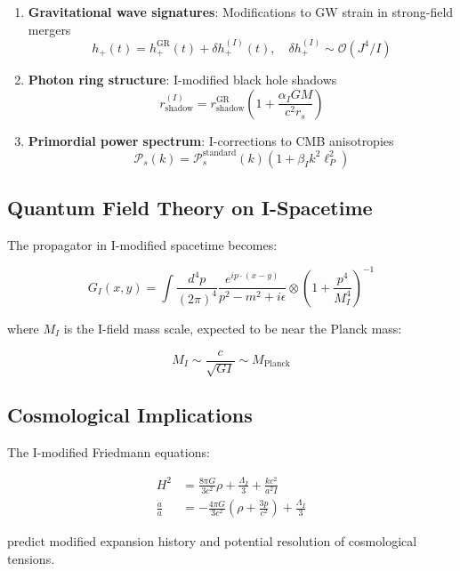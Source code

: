 \begin{enumerate}
    \item \textbf{Gravitational wave signatures}: Modifications to GW strain in strong-field mergers
    \begin{equation}
    \label{eq:gw_strain}
    h_+(t) = h_+^{\text{GR}}(t) + \delta h_+^{(I)}(t), \quad \delta h_+^{(I)} \sim \mathcal{O}(J^4/I)
    \end{equation}
    
    \item \textbf{Photon ring structure}: I-modified black hole shadows
    \begin{equation}
    \label{eq:shadow_radius}
    r_{\text{shadow}}^{(I)} = r_{\text{shadow}}^{\text{GR}} \left(1 + \frac{\alpha_I G M}{c^2 r_s}\right)
    \end{equation}
    
    \item \textbf{Primordial power spectrum}: I-corrections to CMB anisotropies
    \begin{equation}
    \label{eq:power_spectrum}
    \mathcal{P}_s(k) = \mathcal{P}_s^{\text{standard}}(k) \left(1 + \beta_I k^2 \ell_P^2\right)
    \end{equation}
\end{enumerate}

\subsection{Quantum Field Theory on I-Spacetime}

The propagator in I-modified spacetime becomes:

\begin{equation}
\label{eq:i_propagator}
G_I(x,y) = \int \frac{d^4p}{(2\pi)^4} \frac{e^{ip\cdot(x-y)}}{p^2 - m^2 + i\epsilon} \otimes \left(1 + \frac{p^4}{M_I^4}\right)^{-1}
\end{equation}

where $M_I$ is the I-field mass scale, expected to be near the Planck mass:

\begin{equation}
\label{eq:i_mass_scale}
M_I \sim \frac{c}{\sqrt{GI}} \sim M_{\text{Planck}}
\end{equation}

\subsection{Cosmological Implications}

The I-modified Friedmann equations:

\begin{align}
\label{eq:i_friedmann1}
H^2 &= \frac{8\pi G}{3c^2}\rho + \frac{\Lambda_I}{3} + \frac{k c^2}{a^2 I} \\
\label{eq:i_friedmann2}
\frac{\ddot{a}}{a} &= -\frac{4\pi G}{3c^2}\left(\rho + \frac{3p}{c^2}\right) + \frac{\Lambda_I}{3}
\end{align}

predict modified expansion history and potential resolution of cosmological tensions.
